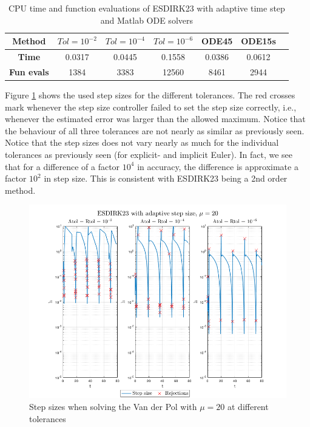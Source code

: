 \begin{table}[H]
    \centering
    \caption{CPU time and function evaluations of ESDIRK23 with adaptive time step and Matlab ODE solvers}
    \begin{tabular}{|c||c|c|c|c|c|c|} \hline
         \textbf{Method}    & $Tol = 10^{-2}$&   $Tol = 10^{-4}$ & $Tol = 10^{-6}$ & ODE45 & ODE15s     \\ \hline \hline 
         \textbf{Time}      & 0.0317   & 0.0445  &   0.1558 & 0.0386 & 0.0612   \\ \hline
         \textbf{Fun evals} &  1384     &   3383    &   12560 & 8461 & 2944  \\ \hline
    \end{tabular}
    \label{tab7:mu20}
\end{table}

Figure \ref{fig7:mu20_h} shows the used step sizes for the different tolerances. The red crosses mark whenever the step size controller failed to set the step size correctly, i.e., whenever the estimated error was larger than the allowed maximum. Notice that the behaviour of all three tolerances are not nearly as similar as previously seen. Notice that the step sizes does not vary nearly as much for the individual tolerances as previously seen (for explicit- and implicit Euler). In fact, we see that for a difference of a factor $10^4$ in accuracy, the difference is approximate a factor $10^2$ in step size. This is consistent with ESDIRK23 being a 2nd order method. 

\begin{figure}[H]
    \centering
    \includegraphics[width=\textwidth]{graphics/opg7/mu20_h.png}
    \caption{Step sizes when solving the Van der Pol with $\mu = 20$ at different tolerances}
    \label{fig7:mu20_h}
\end{figure}

